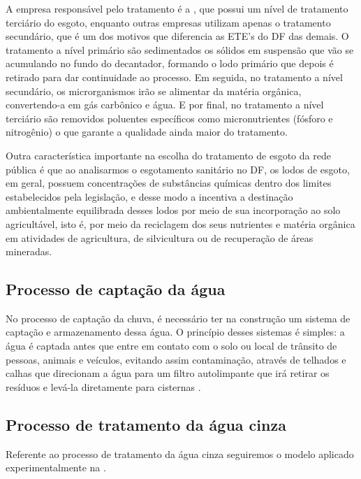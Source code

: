 	A empresa responsável pelo tratamento é a \cite{CAESB}, que possui um nível de tratamento terciário do esgoto, enquanto outras empresas utilizam apenas o tratamento secundário, que é um dos motivos que diferencia as ETE's do DF das demais. O tratamento a nível primário são sedimentados os sólidos em suspensão que vão se acumulando no fundo do decantador, formando o lodo primário que depois é retirado para dar continuidade ao processo. Em seguida, no tratamento a nível secundário, os microrganismos irão se alimentar da matéria orgânica, convertendo-a em gás carbônico e água. E por final, no tratamento a nível terciário são removidos poluentes específicos como micronutrientes (fósforo e nitrogênio) o que garante a qualidade ainda maior do tratamento.

	Outra característica importante na escolha do tratamento de esgoto da rede pública é que ao analisarmos o esgotamento sanitário no DF, os lodos de esgoto, em geral, possuem concentrações de substâncias químicas dentro dos limites estabelecidos pela legislação, e desse modo a \cite{CAESB} incentiva a destinação ambientalmente equilibrada desses lodos por meio de sua incorporação ao solo agricultável, isto é, por meio da reciclagem dos seus nutrientes e matéria orgânica em atividades de agricultura, de silvicultura ou de recuperação de áreas mineradas.

\subsection{Processo de captação da água}

	No processo de captação da chuva, é necessário ter na construção um sistema de captação e armazenamento dessa água. O princípio desses sistemas é simples: a água é captada antes que entre em contato com o solo ou local de trânsito de pessoas, animais e veículos, evitando assim contaminação, através de telhados e calhas que direcionam a água para um filtro autolimpante que irá retirar os resíduos e levá-la diretamente para cisternas \cite{EMBRAPA}.


\subsection{Processo de tratamento da água cinza}

	Referente ao processo de tratamento da água cinza seguiremos o modelo aplicado experimentalmente na \cite{UFES}.

